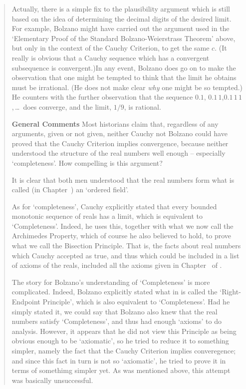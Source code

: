 \begin{quotation}
{        Actually, there is a simple fix to the plausibility argument which is still based on the idea of determining the decimal digits of the desired limit.
    For example, Bolzano might have carried out the argument used in the `Elementary Proof of the Standard Bolzano-Weierstrass Theorem' above, but
     only in the context of the Cauchy Criterion, to get the same $c$. (It really is obvious that
    a Cauchy sequence which has a convergent subsequence is convergent.)In any event,
    Bolzano does go on to make the observation that one might be tempted to think that the limit he obtains must be irrational.
    (He does not make clear {\em why} one might be so tempted.) He counters with the further observation that the sequence
    $0.1$, $0.1\,1$,$0.1\,1\,1$,\,{\ldots}\, does converge, and the limit, $1/9$, is rational.

\VV

        {\bf General Comments} Most historians claim that, regardless of any arguments, given or not given,
    neither Cauchy not Bolzano could have proved that the Cauchy Criterion implies convergence,
    because neither understood the structure of the real numbers well enough -- especially `completeness'. How compelling is this argument?

        It is clear that both men understood that the real numbers form what is called (in Chapter~) an `ordered field'.

        As for `completeness', Cauchy explicitly stated that every bounded monotonic sequence of reals has a limit, which is equivalent to `Completeness'.
    Indeed, he uses this, together with what we now call the Archimedes Property, which of course he also believed to hold,
    to prove what we call the Bisection Principle. That is, the facts about real numbers which Cauchy accepted as true,
    and thus which could be included in a list of axioms of the reals, included all the axioms given in Chapter~ of {\ThisText}.

        The story for Bolzano's understanding of `Completeness' is more complicated.
    Indeed, Bolzano explicitly stated what in {\ThisText} is called the `Right-Endpoint Principle', which is also equivalent to `Completeness'.
    Had he simply stated it, we could say that Bolzano also knew that the real numbers satisfy `Completeness', and thus had enough `axioms' to do analysis.
    However, it appears that he did not view this Principle as being obvious enough to be `axiomatic', so he tried to reduce it to something simpler,
    namely the fact that the Cauchy Criterion implies converegence; and since this fact in turn is not so `axiomatic',
    he tried to prove it in terms of somethimg simpler yet. As was mentioned above, this attempt was basically unsuccessful.

}
\end{quotation}
